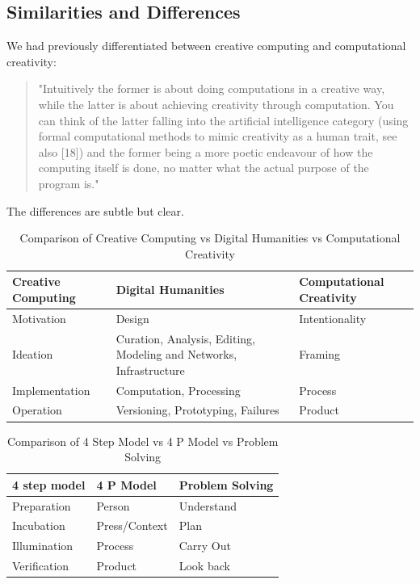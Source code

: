 \subsection{Similarities and Differences}

We had previously differentiated between creative computing and computational creativity:

\begin{quote}
"Intuitively the former is about doing computations in a creative way, while the latter is about achieving creativity through computation. You can think of the latter falling into the artificial intelligence category (using formal computational methods to mimic creativity as a human trait, see also [18]) and the former being a more poetic endeavour of how the computing itself is done, no matter what the actual purpose of the program is." \citep{Hugill2013}
\end{quote}

The differences are subtle but clear.

\begin{table}[htbp]
\centering
\begin{tabular}{|l|p{5cm}|l|}
\hline
\textbf{Creative Computing} & \textbf{Digital Humanities} & \textbf{Computational Creativity} \\ \hline
Motivation  & Design & Intentionality \\ \hline
Ideation & Curation, Analysis, Editing, Modeling and Networks, Infrastructure & Framing \\ \hline
Implementation & Computation, Processing & Process \\ \hline
Operation & Versioning, Prototyping, Failures & Product \\ \hline
\end{tabular}
\caption[Creative Computing vs Digital Humanities vs Computational Creativity]{Comparison of Creative Computing vs Digital Humanities vs Computational Creativity}
\end{table}

\begin{table}[htbp]
\centering
\begin{tabular}{|l|l|l|}
\hline
\textbf{4 step model} & \textbf{4 P Model} & \textbf{Problem Solving} \\ \hline
Preparation   & Person         & Understand  \\ \hline
Incubation    & Press/Context  & Plan        \\ \hline
Illumination  & Process        & Carry Out   \\ \hline
Verification  & Product        & Look back   \\ \hline
\end{tabular}
\caption[4 Step Model vs 4 P Model vs Problem Solving]{Comparison of 4 Step Model vs 4 P Model vs Problem Solving}
\end{table}

